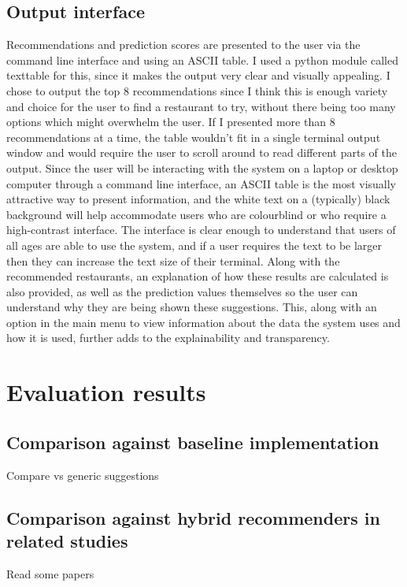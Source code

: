 \documentclass[conference]{IEEEtran}
\begin{document}
\subsection{Output interface}
Recommendations and prediction scores are presented to the user via the command line interface and using an ASCII table. 
I used a python module called texttable for this, since it makes the output very clear and visually appealing. 
I chose to output the top 8 recommendations since I think this is enough variety and choice for the user to find 
a restaurant to try, without there being too many options which might overwhelm the user. 
If I presented more than 8 recommendations at a time, the table wouldn't fit in a single terminal output window and 
would require the user to scroll around to read different parts of the output. 
Since the user will be interacting with the system on a laptop or desktop computer through a command line interface, 
an ASCII table is the most visually attractive way to present information, and the white text on a (typically) black 
background will help accommodate users who are colourblind or who require a high-contrast interface. 
The interface is clear enough to understand that users of all ages are able to use the system, and if a user 
requires the text to be larger then they can increase the text size of their terminal. 
Along with the recommended restaurants, an explanation of how these results are calculated is also provided, as 
well as the prediction values themselves so the user can understand why they are being shown these suggestions. 
This, along with an option in the main menu to view information about the data the system uses and how it is used, 
further adds to the explainability and transparency. 


\section{Evaluation results}

\subsection{Comparison against baseline implementation}
Compare vs generic suggestions

\subsection{Comparison against hybrid recommenders in related studies}
Read some papers
\end{document}
